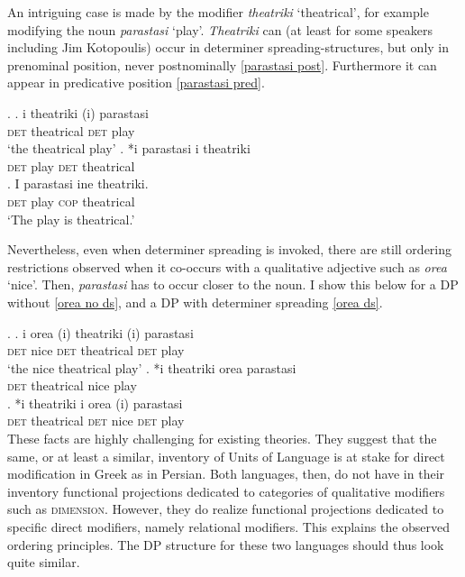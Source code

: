 \documentclass [output=book,colorlinks,citecolor=brown]{langscibook}
\begin{document}
An intriguing case is made by the modifier \textit{theatriki} `theatrical’, for example modifying the noun \textit{parastasi} `play’. \textit{Theatriki} can (at least for some speakers including Jim Kotopoulis) occur in determiner spreading-structures, but only in prenominal position, never postnominally \ref{parastasi post}. Furthermore it can appear in predicative position \ref{parastasi pred}.

\ex. \ag. i theatriki (i) parastasi\\
\textsc{det} theatrical \textsc{det} play\\
`the theatrical play’
\bg. *i parastasi i theatriki\\
\textsc{det} play \textsc{det} theatrical \label{parastasi post}\\
\cg. I parastasi ine theatriki.\\
\textsc{det} play \textsc{cop} theatrical\\
`The play is theatrical.’ \label{parastasi pred}

Nevertheless, even when determiner spreading is invoked, there are still ordering restrictions observed when it co-occurs with a qualitative adjective such as \textit{orea} `nice’. Then, \textit{parastasi} has to occur closer to the noun. I show this below for a DP without \ref{orea no ds}, and a DP with determiner spreading \ref{orea ds}.

\ex. \ag. i orea (i) theatriki (i) parastasi\\
\textsc{det} nice \textsc{det} theatrical \textsc{det} play\\
`the nice theatrical play’
\bg. *i theatriki orea parastasi\\
\textsc{det} theatrical nice play \label{orea no ds}\\
\cg. *i theatriki i orea (i) parastasi\\
\textsc{det} theatrical \textsc{det} nice \textsc{det} play \label{orea ds}\\

These facts are highly challenging for existing theories. They suggest that the same, or at least a similar, inventory of Units of Language is at stake for direct modification in Greek as in Persian. Both languages, then, do not have in their inventory functional projections dedicated to categories of qualitative modifiers such as \textsc{dimension}. However, they do realize functional projections dedicated to specific direct modifiers, namely relational modifiers. This explains the observed ordering principles. The DP structure for these two languages should thus look quite similar. %
\end{document}
